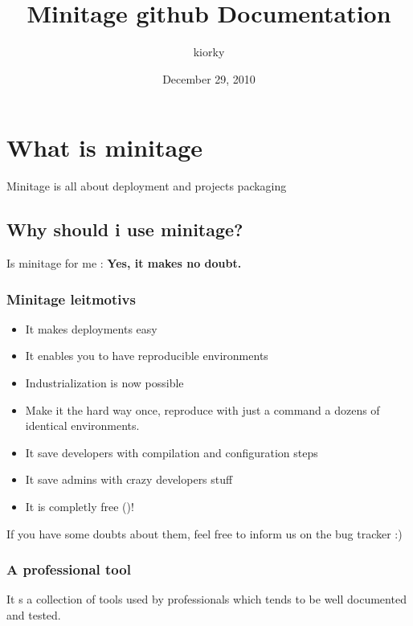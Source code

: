 \documentclass[letterpaper,10pt,english]{sphinxmanual}
\title{Minitage github Documentation}
\date{December 29, 2010}
\author{kiorky}
\begin{document}
\maketitle
\tableofcontents
{}\label{index::doc}



\chapter{What is minitage}
\label{index:what-is-minitage}\label{index:welcome-to-minitage-s-documentation}
Minitage is all about deployment and projects packaging


\section{Why should i use minitage?}
\label{why::doc}\label{why:why-should-i-use-minitage}
Is minitage for me : \textbf{Yes, it makes no doubt.}


\subsection{Minitage leitmotivs}
\label{why:minitage-leitmotivs}\begin{itemize}
\item {} 
It makes deployments easy

\item {} 
It enables you to have reproducible environments

\item {} 
Industrialization is now possible

\item {} 
Make it the hard way once, reproduce with just a command a dozens of identical environments.

\item {} 
It save developers with compilation and configuration steps

\item {} 
It save admins with crazy developers stuff

\item {} 
It is completly free ()!

\end{itemize}

If you have some doubts about them, feel free to inform us on the bug tracker :)


\subsection{A professional tool}
\label{why:a-professional-tool}
It s a collection of tools used by professionals which tends to be well documented and tested.
\end{document}
